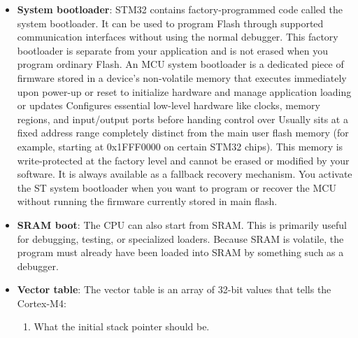 \documentclass{report}
\begin{document}
\begin{itemize}
            \bigbreak \noindent 
            During normal Flash boot, the STM32 aliases this memory at:
            \bigbreak \noindent 
            \begin{bashcode}
            0x00000000
            \end{bashcode}
            \bigbreak \noindent 
            Both addresses refer to the same beginning of Flash during this boot configuration. The CPU reads the initial startup information from 0x00000000, while your linker normally places it physically at 0x08000000.
        \item \textbf{System bootloader}: STM32 contains factory-programmed code called the system bootloader. It can be used to program Flash through supported communication interfaces without using the normal debugger.
            \bigbreak \noindent 
            This factory bootloader is separate from your application and is not erased when you program ordinary Flash.
            \bigbreak \noindent 
            An MCU system bootloader is a dedicated piece of firmware stored in a device's non-volatile memory that executes immediately upon power-up or reset to initialize hardware and manage application loading or updates
            \bigbreak \noindent 
            Configures essential low-level hardware like clocks, memory regions, and input/output ports before handing control over
            \bigbreak \noindent 
            Usually sits at a fixed address range completely distinct from the main user flash memory (for example, starting at 0x1FFF0000 on certain STM32 chips).
            \bigbreak \noindent 
            This memory is write-protected at the factory level and cannot be erased or modified by your software. It is always available as a fallback recovery mechanism.
            \bigbreak \noindent 
            You activate the ST system bootloader when you want to program or recover the MCU without running the firmware currently stored in main flash.
        \item \textbf{SRAM boot}: The CPU can also start from SRAM. This is primarily useful for debugging, testing, or specialized loaders.
            \bigbreak \noindent 
            Because SRAM is volatile, the program must already have been loaded into SRAM by something such as a debugger.
        \item \textbf{Vector table}:  The vector table is an array of 32-bit values that tells the Cortex-M4:
            \begin{enumerate}
                \item What the initial stack pointer should be.

\end{enumerate}
\end{itemize}
\end{document}
